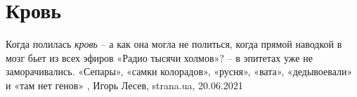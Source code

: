  
 
 
 
 
\chapter{Кровь}

Когда полилась \emph{кровь} – а как она могла не политься, когда прямой
наводкой в мозг бьет из всех эфиров «Радио тысячи холмов»? – в эпитетах уже не
заморачивались. «Сепары», «самки колорадов», «русня», «вата», «дедывоевали» и
«там нет генов»
, 
Игорь Лесев, strana.ua, 20.06.2021

